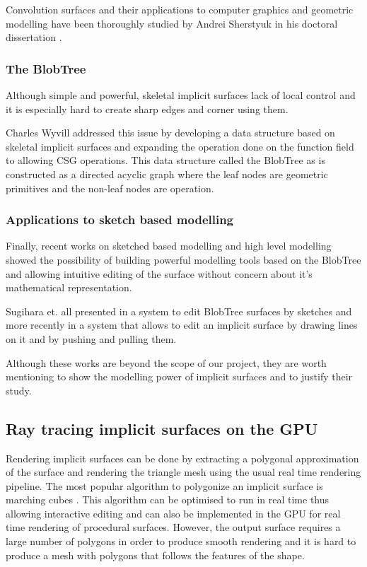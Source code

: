 \documentclass[annual]{acmsiggraph}
\begin{document}
Convolution surfaces and their applications to computer graphics and geometric modelling have been thoroughly studied by Andrei Sherstyuk in his doctoral dissertation \cite{Sherstyuk}.


\subsubsection{The BlobTree}

Although simple and powerful, skeletal implicit surfaces lack of local control and it is especially hard to create sharp edges and corner using them.

Charles Wyvill addressed this issue by developing a data structure based on skeletal implicit surfaces \cite{Wyvill:98a} and expanding the operation done on the function field to allowing CSG operations. This data structure called the BlobTree as is constructed as a directed acyclic graph where the leaf nodes are geometric primitives and the non-leaf nodes are operation.


\subsubsection{Applications to sketch based modelling}

Finally, recent works on sketched based modelling and high level modelling showed the possibility of building powerful modelling tools based on the BlobTree and allowing intuitive editing of the surface without concern about it's mathematical representation.

Sugihara et. all presented in \cite{Schmidt05shapeshop:sketch-based} a system to edit BlobTree surfaces by sketches and more recently in \cite{SWS10} a system that allows to edit an implicit surface by drawing lines on it and by pushing and pulling them.

Although these works are beyond the scope of our project, they are worth mentioning to show the modelling power of implicit surfaces and to justify their study.

\subsection{Ray tracing implicit surfaces on the GPU}

Rendering implicit surfaces can be done by extracting a polygonal approximation of the surface and rendering the triangle mesh using the usual real time rendering pipeline. The most popular algorithm to polygonize an implicit surface is marching cubes \cite{Lorensen:1987:MCH:37402.37422}.
This algorithm can be optimised to run in real time thus allowing interactive editing and can also be implemented in the GPU \cite{Ryan} for real time rendering of procedural surfaces. However, the output surface requires a large number of polygons in order to produce smooth rendering and it is hard to produce a mesh with polygons that follows the features of the shape.
\end{document}
